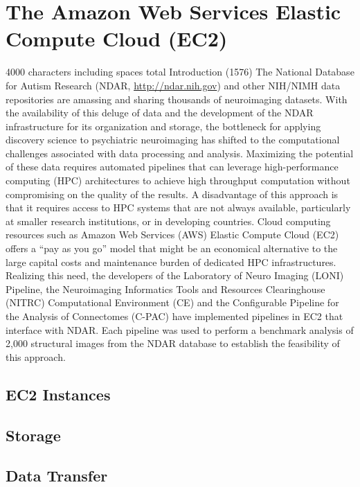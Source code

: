 \documentclass[1p,11pt]{elsarticle}
\begin{document}
\section{The Amazon Web Services Elastic Compute Cloud (EC2)}

4000 characters including spaces total Introduction (1576) The National
Database for Autism Research (NDAR, \url{http://ndar.nih.gov}) and other
NIH/NIMH data repositories are amassing and sharing thousands of
neuroimaging datasets. With the availability of this deluge of data and
the development of the NDAR infrastructure for its organization and
storage, the bottleneck for applying discovery science to psychiatric
neuroimaging has shifted to the computational challenges associated with
data processing and analysis. Maximizing the potential of these data
requires automated pipelines that can leverage high-performance
computing (HPC) architectures to achieve high throughput computation
without compromising on the quality of the results. A disadvantage of
this approach is that it requires access to HPC systems that are not
always available, particularly at smaller research institutions, or in
developing countries. Cloud computing resources such as Amazon Web
Services (AWS) Elastic Compute Cloud (EC2) offers a “pay as you go”
model that might be an economical alternative to the large capital costs
and maintenance burden of dedicated HPC infrastructures. Realizing this
need, the developers of the Laboratory of Neuro Imaging (LONI) Pipeline,
the Neuroimaging Informatics Tools and Resources Clearinghouse (NITRC)
Computational Environment (CE) and the Configurable Pipeline for the
Analysis of Connectomes (C-PAC) have implemented pipelines in EC2 that
interface with NDAR. Each pipeline was used to perform a benchmark
analysis of 2,000 structural images from the NDAR database to establish
the feasibility of this approach.

\subsection{EC2 Instances}
\subsection{Storage}
\subsection{Data Transfer}
\end{document}
